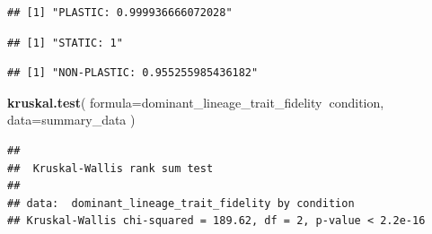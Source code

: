 \documentclass[]{book}
\newenvironment{Shaded}{\begin{snugshade}}{\end{snugshade}}
\newcommand{\DataTypeTok}[1]{\textcolor[rgb]{0.13,0.29,0.53}{#1}}
\newcommand{\KeywordTok}[1]{\textcolor[rgb]{0.13,0.29,0.53}{\textbf{#1}}}
\newcommand{\NormalTok}[1]{#1}
\newcommand{\OperatorTok}[1]{\textcolor[rgb]{0.81,0.36,0.00}{\textbf{#1}}}
\newcommand{\StringTok}[1]{\textcolor[rgb]{0.31,0.60,0.02}{#1}}
\begin{document}
\begin{verbatim}
## [1] "PLASTIC: 0.999936666072028"
\end{verbatim}

\begin{Shaded}
\end{Shaded}

\begin{verbatim}
## [1] "STATIC: 1"
\end{verbatim}

\begin{Shaded}
\end{Shaded}

\begin{verbatim}
## [1] "NON-PLASTIC: 0.955255985436182"
\end{verbatim}

\begin{Shaded}
\begin{Highlighting}[]
\KeywordTok{kruskal.test}\NormalTok{(}
  \DataTypeTok{formula=}\NormalTok{dominant_lineage_trait_fidelity}\OperatorTok{~}\NormalTok{condition,}
  \DataTypeTok{data=}\NormalTok{summary_data}
\NormalTok{)}
\end{Highlighting}
\end{Shaded}

\begin{verbatim}
## 
##  Kruskal-Wallis rank sum test
## 
## data:  dominant_lineage_trait_fidelity by condition
## Kruskal-Wallis chi-squared = 189.62, df = 2, p-value < 2.2e-16
\end{verbatim}

\begin{Shaded}
\end{Shaded}
\end{document}

